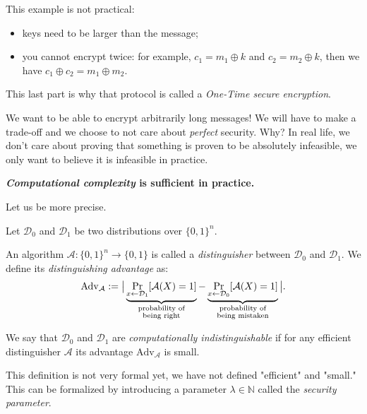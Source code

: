 \documentclass[./main]{subfiles}
\begin{document}
  \begin{rmk}
    This example is not practical:
    \begin{itemize}
      \item keys need to be larger than the message;
      \item you cannot encrypt twice: for example, $c_1 = m_1 \oplus k$ and $c_2 = m_2 \oplus k$, then we have $c_1 \oplus c_2 = m_1 \oplus m_2$.
    \end{itemize}
    This last part is why that protocol is called a \textit{One-Time secure encryption}.
  \end{rmk}

  We want to be able to encrypt arbitrarily long messages!
  We will have to make a trade-off and we choose to not care about \textit{perfect} security.
  Why? In real life, we don't care about proving that something is proven to be absolutely infeasible, we only want to believe it is infeasible in practice.
  \begin{center}
  \textbf{\textit{Computational complexity} is sufficient in practice.}
  \end{center}
  Let us be more precise.

  \begin{defn}
    Let $\mathcal{D}_0$ and $\mathcal{D}_1$ be two distributions over $\{0,1\}^n$.

    An algorithm $\mathcal{A} : \{0,1\}^n \to \{0,1\}$ is called a \textit{distinguisher} between $\mathcal{D}_0$ and $\mathcal{D}_1$. We define its \textit{distinguishing advantage} as:
    \[
      \mathrm{Adv}_\mathcal{A} := \big| \underbrace{\Pr_{x \gets \mathcal{D}_1} [\mathcal{A}(X) = 1]}_{ \mathclap{\substack{\text{probability of}\\ \text{being right}}} } - \underbrace{\Pr_{x \gets \mathcal{D}_0} [\mathcal{A}(X) = 1]}_{\mathclap{\substack{\text{probability of}\\ \text{being mistaken}}}} \big|
    .\] 

    We say that $\mathcal{D}_0$ and $\mathcal{D}_1$ are \textit{computationally indistinguishable} if for any efficient distinguisher $\mathcal{A}$ its advantage $\mathrm{Adv}_\mathcal{A}$ is small.
  \end{defn}

  This definition is not very formal yet, we have not defined "efficient" and "small."
  This can be formalized by introducing a parameter $\lambda \in \mathds{N}$ called the \textit{security parameter}.
\end{document}
